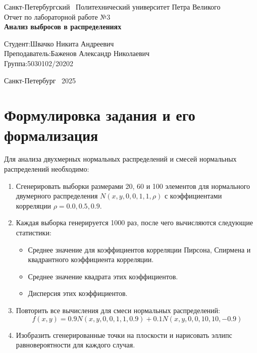 \documentclass[a4paper]{article}
\begin{document}
    \begin{titlepage}
        \Large
        \begin{center}
            Санкт-Петербургский \ Политехнический университет Петра Великого\\
            \vspace{10em}Отчет по лабораторной работе №3\\
            \vspace{2em}
            \textbf{Анализ выбросов в распределениях}
        \end{center}
        \vspace{6em}
        \hfill\parbox{10cm}{
            \hspace*{2cm}\hspace*{-4cm}Студент:\hfill Швачко Никита Андреевич\\
            \hspace*{2cm}\hspace*{-4cm}Преподаватель:\hfill Баженов Александр Николаевич\\
            \hspace*{2cm}\hspace*{-4cm}Группа:\hfill 5030102/20202
        }
        \vspace{\fill}
        \begin{center}
            Санкт-Петербург \ 2025
        \end{center}
    \end{titlepage}


    \section{Формулировка задания и его формализация}\label{sec:task}
    Для анализа двухмерных нормальных распределений и смесей нормальных распределений необходимо:
    \begin{enumerate}
        \item Сгенерировать выборки размерами 20, 60 и 100 элементов для нормального двумерного распределения $N(x, y, 0,0,1,1,\rho)$ с коэффициентами корреляции $\rho = 0.0, 0.5, 0.9$.
        \item Каждая выборка генерируется 1000 раз, после чего вычисляются следующие статистики:
        \begin{itemize}
            \item Среднее значение для коэффициентов корреляции Пирсона, Спирмена и квадрантного коэффициента корреляции.
            \item Среднее значение квадрата этих коэффициентов.
            \item Дисперсия этих коэффициентов.
        \end{itemize}
        \item Повторить все вычисления для смеси нормальных распределений:
        $$f(x, y) = 0.9 N(x, y, 0,0,1,1,0.9) + 0.1 N(x, y, 0,0,10,10,-0.9)$$
        \item Изобразить сгенерированные точки на плоскости и нарисовать эллипс равновероятности для каждого случая.
    \end{enumerate}
\end{document}
